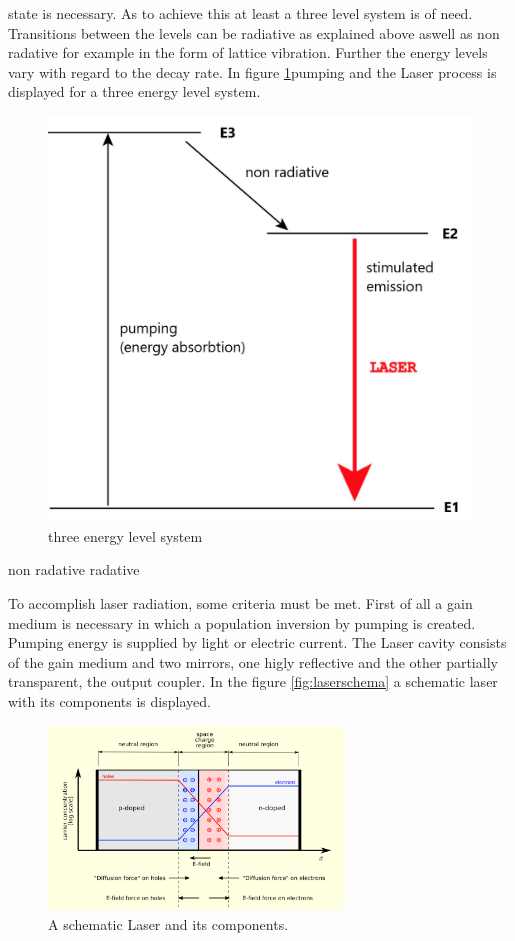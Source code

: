 state is necessary.
As to achieve this at least a three level system is of need.
Transitions between the levels can be radiative as explained above
aswell as non radative for example in the form of lattice vibration.
Further the energy levels vary with regard
to the decay rate. In figure \ref{fig:3_n}pumping and the Laser
process is displayed for a three energy level system.
\begin{figure}
  \centering
  \includegraphics{Laser_3_Niveau.jpg}
  \caption{three energy level system}
  \label{fig:3_n}
\end{figure}

non radative
radative


To accomplish laser radiation, some criteria must be met.
First of all a gain medium is necessary in which
a population inversion by pumping is created.
Pumping energy is supplied by light or electric current.
The Laser cavity consists of the gain medium and two
mirrors, one higly reflective and the other
partially transparent,
the output coupler.
In the figure \ref{fig:laserschema}
a schematic laser with its components is displayed.
\begin{figure}
\centering
\includegraphics[width=0.7\textwidth]{equilibrium.png}
\caption{A schematic Laser and its components.
\cite{wiki_diode}}
\label{fig:equi}
\end{figure}

